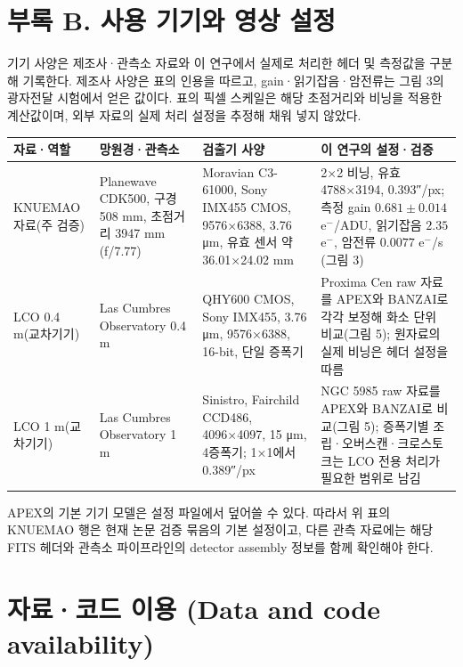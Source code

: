 \section{부록 B. 사용 기기와 영상 설정}

기기 사양은 제조사·관측소 자료와 이 연구에서 실제로 처리한 헤더 및 측정값을 구분해 기록한다. 제조사 사양은 표의 인용을 따르고, gain·읽기잡음·암전류는 그림 3의 광자전달 시험에서 얻은 값이다. 표의 픽셀 스케일은 해당 초점거리와 비닝을 적용한 계산값이며, 외부 자료의 실제 처리 설정을 추정해 채워 넣지 않았다.



\begin{table}[!t]
\centering\small
\begin{tabularx}{\textwidth}{XXXX}
\toprule
자료·역할 & 망원경·관측소 & 검출기 사양 & 이 연구의 설정·검증 \\
\midrule
KNUEMAO 자료(주 검증) & Planewave CDK500, 구경 508 mm, 초점거리 3947 mm (f/7.77) & Moravian C3-61000, Sony IMX455 CMOS, 9576×6388, 3.76 μm, 유효 센서 약 36.01×24.02 mm \citep{moravian_c361000_specs} & 2×2 비닝, 유효 4788×3194, 0.393″/px; 측정 gain $0.681\pm0.014$ e$^-$/ADU, 읽기잡음 $2.35$ e$^-$, 암전류 $0.0077$ e$^-$/s (그림 3) \\
LCO 0.4 m(교차기기) & Las Cumbres Observatory 0.4 m & QHY600 CMOS, Sony IMX455, 3.76 μm, 9576×6388, 16-bit, 단일 증폭기 \citep{qhy600_specs} & Proxima Cen raw 자료를 APEX와 BANZAI로 각각 보정해 화소 단위 비교(그림 5); 원자료의 실제 비닝은 헤더 설정을 따름 \\
LCO 1 m(교차기기) & Las Cumbres Observatory 1 m & Sinistro, Fairchild CCD486, 4096×4097, 15 μm, 4증폭기; 1×1에서 0.389″/px \citep{lco_sinistro_specs} & NGC 5985 raw 자료를 APEX와 BANZAI로 비교(그림 5); 증폭기별 조립·오버스캔·크로스토크는 LCO 전용 처리가 필요한 범위로 남김 \\
\bottomrule
\end{tabularx}
\end{table}

APEX의 기본 기기 모델은 설정 파일에서 덮어쓸 수 있다. 따라서 위 표의 KNUEMAO 행은 현재 논문 검증 묶음의 기본 설정이고, 다른 관측 자료에는 해당 FITS 헤더와 관측소 파이프라인의 detector assembly 정보를 함께 확인해야 한다.



\section{자료·코드 이용 (Data and code availability)}

